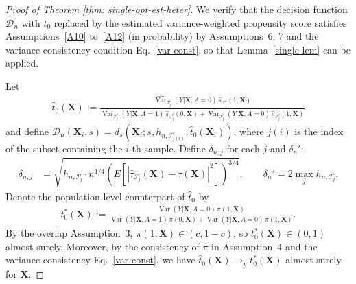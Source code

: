\documentclass[11pt]{article}
\theoremstyle{referenceplain}
\theoremstyle{referencedefinition}
\theoremstyle{referenceremark}
\begin{document}
\begin{proof}[Proof of Theorem \ref{thm: single-opt-est-heter}]
    We verify that the decision function $\mathcal{D}_n$ 
    with $t_0$ replaced by the estimated variance-weighted 
    propensity score satisfies Assumptions~\ref{A10} 
    to~\ref{A12} (in probability) by Assumptions~6, 7 and 
    the variance consistency condition 
    Eq.~\eqref{var-const}, so that 
    Lemma~\ref{single-lem} can be applied.

    Let 
    \begin{align*}
        \widehat{t}_0(\mathbf{X})
        :=\frac{\widehat{\operatorname{Var}}_{\mathcal{I}_{j}^c}
        (Y|\mathbf{X},A\!=\!0)\,
        \widehat{\pi}_{\mathcal{I}_{j}^c}(1,\mathbf{X})}
        {\widehat{\operatorname{Var}}_{\mathcal{I}_{j}^c}
        (Y|\mathbf{X},A\!=\!1)\,
        \widehat{\pi}_{\mathcal{I}_{j}^c}(0,\mathbf{X})
        +\widehat{\operatorname{Var}}_{\mathcal{I}_{j}^c}
        (Y|\mathbf{X},A\!=\!0)\,
        \widehat{\pi}_{\mathcal{I}_{j}^c}(1,\mathbf{X})}
    \end{align*}
    and define 
    $\mathcal{D}_n(\mathbf{X}_i,s)
    =d_{s}(\mathbf{X}_i;s,h_{n,\mathcal{I}_{j(i)}^c},
    \widehat{t}_0(\mathbf{X}_i))$, where $j(i)$ is 
    the index of the subset containing the $i$-th sample. 
    Define {$\delta_{n,j}$ for each $j$} and $\delta_n'$:
    \begin{align*}
        {\delta_{n,j}}
        &=\sqrt{h_{n,\mathcal{I}_{j}^c}\cdot n^{1/4}
        \left(E\!\left[|\widehat{\tau}_{\mathcal{I}_{j}^c}
        (\mathbf{X})-\tau(\mathbf{X})|^2\right]\right)^{3/4}},
        \qquad
        \delta_n'=2\max_j h_{n,\mathcal{I}_{j}^c}.
    \end{align*}
    Denote the population-level counterpart of 
    $\widehat{t}_0$ by
    \begin{align*}
        t_0^*(\mathbf{X})
        :=\frac{\operatorname{Var}(Y|\mathbf{X},A\!=\!0)\,
        \pi(1,\mathbf{X})}
        {\operatorname{Var}(Y|\mathbf{X},A\!=\!1)\,
        \pi(0,\mathbf{X})
        +\operatorname{Var}(Y|\mathbf{X},A\!=\!0)\,
        \pi(1,\mathbf{X})}.
    \end{align*}
    By the overlap Assumption~3, 
    $\pi(1,\mathbf{X})\in(c,1-c)$, so 
    $t_0^*(\mathbf{X})\in(0,1)$ almost surely. 
    Moreover, by the consistency of $\widehat{\pi}$ in 
    Assumption~4 and the variance consistency 
    Eq.~\eqref{var-const}, we have 
    $\widehat{t}_0(\mathbf{X})\to_p t_0^*(\mathbf{X})$ 
    almost surely for $\mathbf{X}$.


\end{proof}
\end{document}
